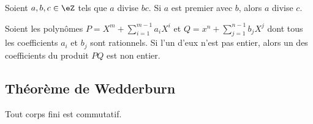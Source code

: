 \begin{lemma}         \label{LemSdnZNX}
    Soient \( a,b,c\in \eZ\) tels que \( a\) divise \( bc\). Si \( a\) est premier avec \( b\), alors \( a\) divise \( c\).
\end{lemma}

\begin{lemma}       \label{LemEfdkZw}   
    Soient les polynômes \( P=X^m+\sum_{i=1}^{m-1}a_iX^i\) et \( Q=x^n+\sum_{j=1}^{n-1}b_jX^j\) dont tous les coefficients \( a_i\) et \( b_j\) sont rationnels. Si l'un d'eux n'est pas entier, alors un des coefficients du produit \( PQ\) est non entier.
\end{lemma}

\subsection{Théorème de Wedderburn}

\begin{theorem}    \label{ThoMncIWA}
    Tout corps fini est commutatif.
\end{theorem}

